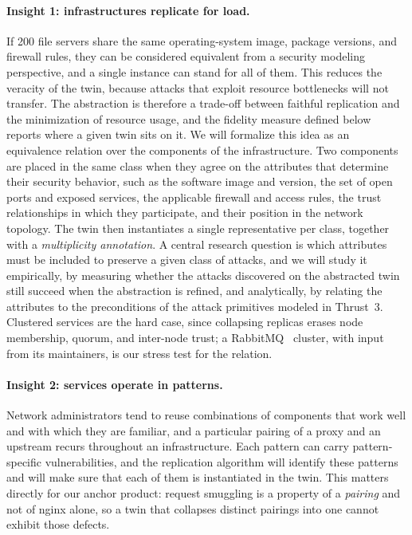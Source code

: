 \paragraph{Insight 1: infrastructures replicate for load.}
If 200 file servers share the same operating-system image, package versions,
and firewall rules, they can be considered equivalent from a security
modeling perspective, and a single instance can stand for all of them. This reduces the veracity of the twin, because attacks that exploit resource
bottlenecks will not transfer. The abstraction is therefore a trade-off
between faithful replication and the minimization of resource usage, and the
fidelity measure defined below reports where a given twin sits on it. We will formalize this idea as an equivalence relation over the
components of the infrastructure. Two components are placed in the same class
when they agree on the attributes that determine their security behavior,
such as the software image and version, the set of open ports and exposed
services, the applicable firewall and access rules, the trust relationships
in which they participate, and their position in the network topology. The
twin then instantiates a single representative per class, together with a
\emph{multiplicity annotation}. A central research question is which
attributes must be included to preserve a given class of attacks, and we will
study it empirically, by measuring whether the attacks discovered on the
abstracted twin still succeed when the abstraction is refined, and
analytically, by relating the attributes to the preconditions of the attack
primitives modeled in Thrust~3. Clustered services are the hard case, since
collapsing replicas erases node membership, quorum, and inter-node trust; a
RabbitMQ~\cite{rabbitmq} cluster, with input from its maintainers, is our
stress test for the relation.

\paragraph{Insight 2: services operate in patterns.}
Network administrators tend to reuse combinations of components that work
well and with which they are familiar, and a particular pairing of a proxy
and an upstream recurs throughout an infrastructure. Each pattern can
carry pattern-specific vulnerabilities, and the replication algorithm will
identify these patterns and will make sure that each of them is instantiated
in the twin. This matters directly for our anchor product: request smuggling is a property
of a \emph{pairing} and not of nginx alone, so a twin that collapses distinct
pairings into one cannot exhibit those defects.


